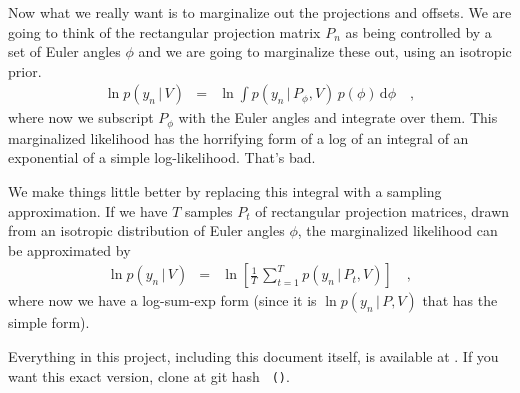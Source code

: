 \documentclass[12pt]{article}
\newcommand{\given}{\,|\,}
\newcommand{\dd}{\mathrm{d}}
\begin{document}
Now what we really want is to marginalize out the projections and
offsets.
We are going to think of the rectangular projection matrix $P_n$ as
being controlled by a set of Euler angles $\phi$ and we are going to
marginalize these out, using an isotropic prior.
\begin{eqnarray}
  \ln p(y_n\given V) &=& \ln \int p(y_n\given P_{\phi},V)\,p(\phi)\,\dd\phi
  \quad,
\end{eqnarray}
where now we subscript $P_{\phi}$ with the Euler angles and integrate
over them.
This marginalized likelihood has the horrifying form of a log of an
integral of an exponential of a simple log-likelihood.  That's bad.

We make things little better by replacing this integral with a
sampling approximation.
If we have $T$ samples $P_t$ of rectangular projection matrices, drawn
from an isotropic distribution of Euler angles $\phi$, the
marginalized likelihood can be approximated by
\begin{eqnarray}
  \ln p(y_n\given V) &=& \ln\left[\frac{1}{T}\,\sum_{t=1}^T p(y_n\given P_t,V)\right]
  \quad,
\end{eqnarray}
where now we have a log-sum-exp form (since it is $\ln p(y_n\given
P,V)$ that has the simple form).

\bigskip

Everything in this project, including this document itself, is
available at \giturl.  If you want this exact version, clone at git
hash \texttt{\githash~(\gitdate)}.
\end{document}

